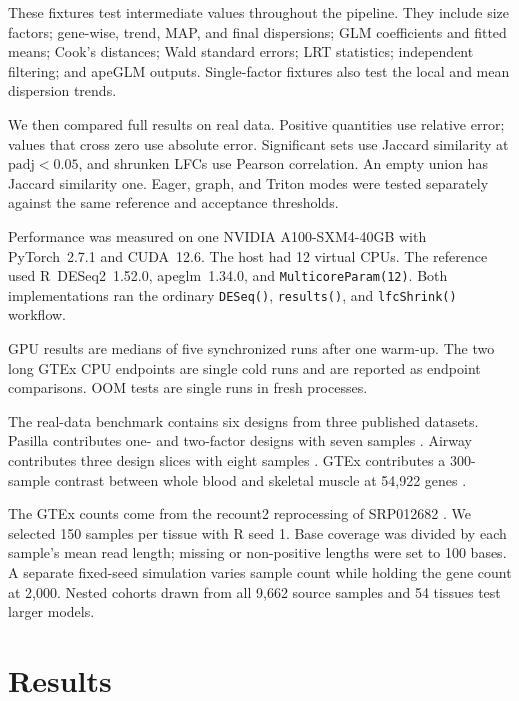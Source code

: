 \documentclass[12pt]{article}
\begin{document}
These fixtures test intermediate values throughout the pipeline. They include
size factors; gene-wise, trend, MAP, and final dispersions; GLM coefficients and
fitted means; Cook's distances; Wald standard errors; LRT statistics;
independent filtering; and apeGLM outputs. Single-factor fixtures also test the
local and mean dispersion trends.

We then compared full results on real data. Positive quantities use relative
error; values that cross zero use absolute error. Significant sets use Jaccard
similarity at $\mathrm{padj}<0.05$, and shrunken LFCs use Pearson correlation.
An empty union has Jaccard similarity one. Eager, graph, and Triton modes were
tested separately against the same reference and acceptance thresholds.

Performance was measured on one NVIDIA A100-SXM4-40GB with PyTorch~2.7.1 and
CUDA~12.6. The host had 12 virtual CPUs. The reference used R~DESeq2~1.52.0,
apeglm~1.34.0, and \texttt{MulticoreParam(12)}. Both implementations ran the
ordinary \texttt{DESeq()}, \texttt{results()}, and \texttt{lfcShrink()}
workflow.

GPU results are medians of five synchronized runs after one warm-up. The two
long GTEx CPU endpoints are single cold runs and are reported as endpoint
comparisons. OOM tests are single runs in fresh processes.

The real-data benchmark contains six designs from three published datasets.
Pasilla contributes one- and two-factor designs with seven samples
\citep{brooks2011pasilla}. Airway contributes three design slices with eight
samples \citep{himes2014airway}. GTEx contributes a 300-sample contrast between
whole blood and skeletal muscle at 54{,}922 genes \citep{gtex2020atlas}.

The GTEx counts come from the recount2 reprocessing of SRP012682
\citep{colladotorres2017recount2}. We selected 150 samples per tissue with R
seed 1. Base coverage was divided by each sample's mean read length; missing or
non-positive lengths were set to 100 bases. A separate fixed-seed simulation
varies sample count while holding the gene count at 2{,}000. Nested cohorts
drawn from all 9{,}662 source samples and 54 tissues test larger models.

\section{Results}
\end{document}

